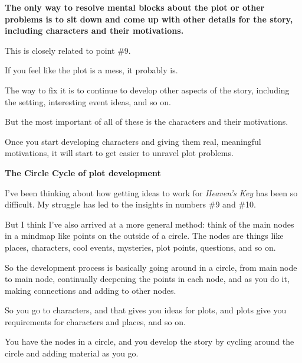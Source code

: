 \begin{compactdesc}
		\item[\tr{010}] \textbf{The only way to resolve mental blocks about the plot or other problems is to sit down and come up with other details for the story, including characters and their motivations.}
			\begin{compactitem}
				\item This is closely related to point \#9. 
				\item If you feel like the plot is a mess, it probably is.
				\item The way to fix it is to continue to develop other aspects of the story, including the setting, interesting event ideas, and so on.
				\item But the most important of all of these is the characters and their motivations.
				\item Once you start developing characters and giving them real, meaningful motivations, it will start to get easier to unravel plot problems.
			\end{compactitem}
			
		\item[\tr{011}] \textbf{The Circle Cycle of plot development}
			\begin{compactitem}
				\item I've been thinking about how getting ideas to work for \textit{Heaven's Key} has been so difficult. My struggle has led to the insights in numbers \#9 and \#10.
				\item But I think I've also arrived at a more general method: think of the main nodes in a mindmap like points on the outside of a circle. The nodes are things like places, characters, cool events, mysteries, plot points, questions, and so on.
				\item So the development process is basically going around in a circle, from main node to main node, continually deepening the points in each node, and as you do it, making connections and adding to other nodes.
				\item So you go to characters, and that gives you ideas for plots, and plots give you requirements for characters and places, and so on.
				\item You have the nodes in a circle, and you develop the story by cycling around the circle and adding material as you go.
			\end{compactitem}
			

\end{compactdesc}
